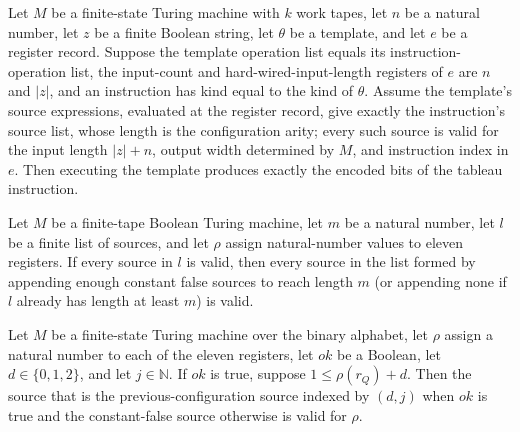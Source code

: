 \begin{theorem}
\label{Complexity.UTab.instr_bits}
\leanok
{}
Let $M$ be a finite-state Turing machine with $k$ work tapes, let $n$ be a natural
number, let $z$ be a finite Boolean string, let $\theta$ be a template, and let $e$ be a
register record. Suppose the template operation list equals its instruction-operation
list, the input-count and hard-wired-input-length registers of $e$ are $n$ and $|z|$,
and an instruction has kind equal to the kind of $\theta$. Assume the template’s source
expressions, evaluated at the register record, give exactly the instruction’s source
list, whose length is the configuration arity; every such source is valid for the input
length $|z|+n$, output width determined by $M$, and instruction index in $e$. Then
executing the template produces exactly the encoded bits of the tableau instruction.
\end{theorem}

\begin{theorem}
\label{Complexity.UTab.ok_padS}
\leanok
{}
Let $M$ be a finite-tape Boolean Turing machine, let $m$ be a natural number, let $l$ be
a finite list of sources, and let $\rho$ assign natural-number values to eleven
registers. If every source in $l$ is valid, then every source in the list formed by
appending enough constant false sources to reach length $m$ (or appending none if $l$
already has length at least $m$) is valid.
\end{theorem}

\begin{theorem}
\label{Complexity.UTab.ok_nbS}
\leanok
{}
Let $M$ be a finite-state Turing machine over the binary alphabet, let $\rho$ assign a
natural number to each of the eleven registers, let $ok$ be a Boolean, let
$d\in\{0,1,2\}$, and let $j\in\mathbb N$. If $ok$ is true, suppose $1\leq\rho(r_Q)+d$.
Then the source that is the previous-configuration source indexed by $(d,j)$ when $ok$
is true and the constant-false source otherwise is valid for $\rho$.
\end{theorem}


